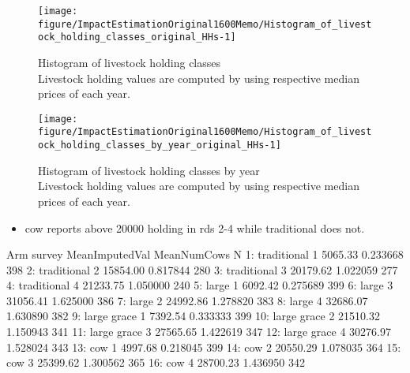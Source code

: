 \begin{Schunk}
\begin{figure}

{\centering \texttt{[image: figure/ImpactEstimationOriginal1600Memo/Histogram\_of\_livestock\_holding\_classes\_original\_HHs-1]} 

}

\caption{Histogram of livestock holding classes\\ {\footnotesize Livestock holding values are computed by using respective median prices of each year.\setlength{\baselineskip}{8pt}}}\label{Figure Histogram of livestock holding classes original HHs}
\end{figure}
\end{Schunk}
\begin{Schunk}
\begin{figure}

{\centering \texttt{[image: figure/ImpactEstimationOriginal1600Memo/Histogram\_of\_livestock\_holding\_classes\_by\_year\_original\_HHs-1]} 

}

\caption{Histogram of livestock holding classes by year\\ {\footnotesize Livestock holding values are computed by using respective median prices of each year.\setlength{\baselineskip}{8pt}}}\label{Figure Histogram of livestock holding classes by year original HHs}
\end{figure}
\end{Schunk}
\begin{itemize}
\vspace{1.0ex}\setlength{\itemsep}{1.0ex}\setlength{\baselineskip}{12pt}
\item	\textsf{cow} reports above 20000 holding in rds 2-4 while \textsf{traditional} does not.
\end{itemize}
\begin{Schunk}
\begin{Soutput}
            Arm survey MeanImputedVal MeanNumCows   N
 1: traditional      1        5065.33    0.233668 398
 2: traditional      2       15854.00    0.817844 280
 3: traditional      3       20179.62    1.022059 277
 4: traditional      4       21233.75    1.050000 240
 5:       large      1        6092.42    0.275689 399
 6:       large      3       31056.41    1.625000 386
 7:       large      2       24992.86    1.278820 383
 8:       large      4       32686.07    1.630890 382
 9: large grace      1        7392.54    0.333333 399
10: large grace      2       21510.32    1.150943 341
11: large grace      3       27565.65    1.422619 347
12: large grace      4       30276.97    1.528024 343
13:         cow      1        4997.68    0.218045 399
14:         cow      2       20550.29    1.078035 364
15:         cow      3       25399.62    1.300562 365
16:         cow      4       28700.23    1.436950 342
\end{Soutput}
\end{Schunk}

